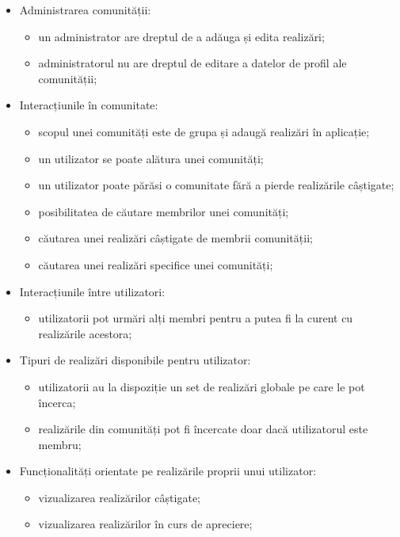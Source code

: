 \begin{itemize}
\begin{itemize}
        \end{itemize}
    \item{Administrarea comunității:}
        \begin{itemize}
            \item un administrator are dreptul de a adăuga și edita realizări;
            \item administratorul nu are dreptul de editare a datelor de profil ale comunității; 
        \end{itemize}
    \item{Interacțiunile în comunitate:}
        \begin{itemize}
            \item scopul unei comunități este de grupa și adaugă realizări în aplicație;
            \item un utilizator se poate alătura unei comunități;
            \item un utilizator poate părăsi o comunitate fără a pierde realizările câștigate;
            \item posibilitatea de căutare membrilor unei comunități;
            \item căutarea unei realizări câștigate de membrii comunității;
            \item căutarea unei realizări specifice unei comunități;
        \end{itemize}
    \item{Interacțiunile între utilizatori:}
        \begin{itemize}
            \item utilizatorii pot urmări alți membri pentru a putea fi la curent cu realizările acestora;
        \end{itemize}
    \item{Tipuri de realizări disponibile pentru utilizator:}
        \begin{itemize}
            \item utilizatorii au la dispoziție un set de realizări globale pe care le pot încerca;
            \item realizările din comunități pot fi încercate doar dacă utilizatorul este membru;
        \end{itemize}
    \item{Funcționalități orientate pe realizările proprii unui utilizator:}
        \begin{itemize}
            \item vizualizarea realizărilor câștigate;
            \item vizualizarea realizărilor în curs de apreciere;

\end{itemize}
\end{itemize}
